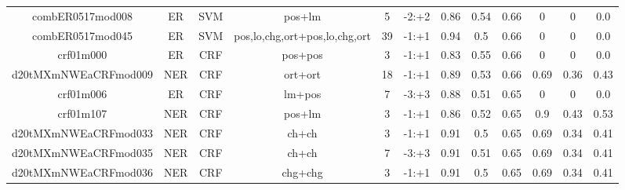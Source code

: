 \documentclass[a4paper]{article}
\begin{document}
\begin{landscape}
\begin{center}
\begin{tabular}{ |c|c|c|c|c|c|c|c|c|c|c|c|}
 	
 
 	
 		
 		\small{ combER0517mod008 } & ER & SVM & pos+lm  &  5 &  -2:+2  &  0.86 & 0.54 & 0.66  &  0 & 0 & 0.0 \\
 		

 	
 
 	
 		
 		\small{ combER0517mod045 } & ER & SVM & pos,lo,chg,ort+pos,lo,chg,ort  &  39 &  -1:+1  &  0.94 & 0.5 & 0.66  &  0 & 0 & 0.0 \\
 		

 	
 
 	
 		
 		\small{ crf01m000 } & ER & CRF & pos+pos  &  3 &  -1:+1  &  0.83 & 0.55 & 0.66  &  0 & 0 & 0.0 \\
 		

 	
 
 	
 		
 		\small{ d20tMXmNWEaCRFmod009 } & NER & CRF & ort+ort  &  18 &  -1:+1  &  0.89 & 0.53 & 0.66  &  0.69 & 0.36 & 0.43 \\
 		

 	
 
 	
 		
 		\small{ crf01m006 } & ER & CRF & lm+pos  &  7 &  -3:+3  &  0.88 & 0.51 & 0.65  &  0 & 0 & 0.0 \\
 		

 	
 
 	
 		
 		\small{ crf01m107 } & NER & CRF & pos+lm  &  3 &  -1:+1  &  0.86 & 0.52 & 0.65  &  0.9 & 0.43 & 0.53 \\
 		

 	
 
 	
 		
 		\small{ d20tMXmNWEaCRFmod033 } & NER & CRF & ch+ch  &  3 &  -1:+1  &  0.91 & 0.5 & 0.65  &  0.69 & 0.34 & 0.41 \\
 		

 	
 
 	
 		
 		\small{ d20tMXmNWEaCRFmod035 } & NER & CRF & ch+ch  &  7 &  -3:+3  &  0.91 & 0.51 & 0.65  &  0.69 & 0.34 & 0.41 \\
 		

 	
 
 	
 		
 		\small{ d20tMXmNWEaCRFmod036 } & NER & CRF & chg+chg  &  3 &  -1:+1  &  0.91 & 0.5 & 0.65  &  0.69 & 0.34 & 0.41 \\
 		


\end{tabular}
\end{center}
\end{landscape}
\end{document}
